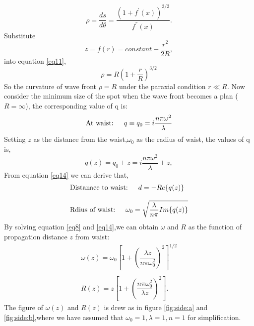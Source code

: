\documentclass{article}
\begin{document}
\begin{equation}\label{eq11}
\rho=\dfrac{ds}{d\theta}=\dfrac{{(1+f^{'}(x))}^{3/2}}{f^{''}(x)}.
\end{equation}
Substitute $$z=f(r)=constant-\dfrac{r^2}{2R},$$into equation \ref{eq11},
\begin{equation}\label{eq12}
\rho=R(1+\dfrac{r}{R})^{3/2}
\end{equation}
So the curvature of wave front $\rho=R$ under the paraxial condition $r\ll R$.
Now consider the minimum size of the spot when the wave front becomes a plan ($R=\infty$), the corresponding value of q is:
\begin{equation}\label{eq13}
\text{At waist:}\indent q\equiv q_0=i\dfrac{n\pi\omega^2}{\lambda}
\end{equation}
Setting $z$ as the distance from the waist,$\omega_0$ as the radius of waist, the values of q is,
\begin{equation}\label{eq14}
q(z)=q_0+z=i\dfrac{n\pi\omega^2}{\lambda}+z,
\end{equation}
From equation \ref{eq14} we can derive that,
\begin{equation}\label{eq15}
\begin{array}{l}
\text{Distanace to waist:}\indent d=-Re\{q(z)\}
\\
\\
\text{Rdius of waist:}\indent \omega_0=\sqrt{\dfrac{\lambda}{n\pi}Im\{q(z)\}}
\end{array}
\end{equation}
By solving equation \ref{eq8} and \ref{eq14},we can obtain $\omega$ and $R$ as the function of propagation distance $z$ from waist:
\begin{equation}\label{eq16}
\begin{array}{l}
\omega(z)=\omega_0[1+(\dfrac{\lambda z}{n\pi\omega_0^2})^2]^{1/2}
\\
\\
R(z)=z[1+(\dfrac{n\pi\omega_0^2}{\lambda z})^2].
\end{array}
\end{equation}
The figure of $\omega(z)$ and $R(z)$ is drew as in figure \ref{fig:side:a} and \ref{fig:side:b},where we have assumed that $\omega_0=1,\lambda=1,n=1$ for simplification.
\end{document}
